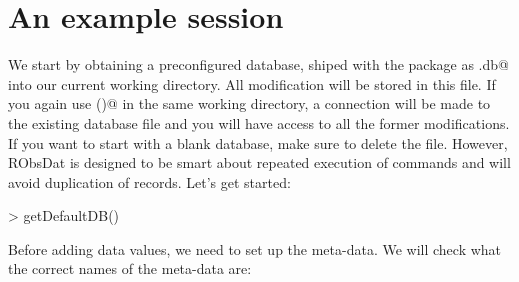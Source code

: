 \documentclass[a4paper]{article}
\begin{document}
\section{An example session}
\label{sec:example}
We start by obtaining a preconfigured database,
shiped with the package as \verb@RODM.db@ into our
current working directory. All modification will
be stored in this file. If you again use
\verb@getDefaultDB()@ in the same
working directory, a connection will be made to
the existing database file and you will have
access to all the former modifications. If you
want to start with a blank database, make sure to
delete the file. However, RObsDat is designed to
be smart about repeated execution of commands and
will avoid duplication of records. Let's get
started:
\begin{Schunk}
\begin{Sinput}
> getDefaultDB()
\end{Sinput}
\end{Schunk}

Before adding data values, we need to set up the
meta-data. We will check what the correct names of
the meta-data are:
\end{document}
